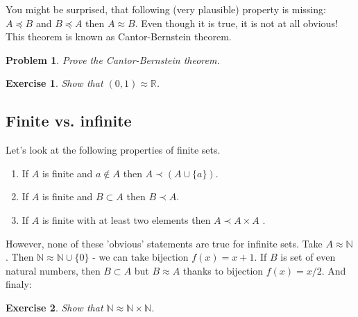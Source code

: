 \documentclass[11pt,a5paper]{article}
\newtheorem{exercise}{Exercise}
\newtheorem{problem}{Problem}
\begin{document}
\noindent You might be surprised, that following (very plausible) property is missing: $A\preceq B$ and $B\preceq A$ then $A\approx B$. Even though it is true, it is not at all obvious! This theorem is known as Cantor-Bernstein theorem.

\begin{problem} Prove the Cantor-Bernstein theorem.
\end{problem}

\begin{exercise} Show that $(0,1)\approx\mathbb{R}$.
\end{exercise}

\subsection*{Finite vs. infinite}

\noindent Let's look at the following properties of finite sets.
\begin{enumerate}
  \item If $A$ is finite and $a \not\in A$ then $A\prec (A\cup \{a\})$.
  \item If $A$ is finite and $B\subset A$ then $B\prec A$.
  \item If $A$ is finite with at least two elements then $A \prec A\times A$ .
\end{enumerate}

\noindent However, none of these 'obvious' statements are true for infinite sets. Take $A\approx \mathbb{N}$. Then $\mathbb{N} \approx \mathbb{N}\cup \{0\}$ - we can take bijection $f(x) = x+1$. If $B$ is set of even natural numbers, then $B\subset A$ but $B\approx A$ thanks to bijection $f(x) = x/2$. And finaly:
\begin{exercise}
Show that $\mathbb{N} \approx \mathbb{N} \times \mathbb{N}$.
\end{exercise}
\end{document}
